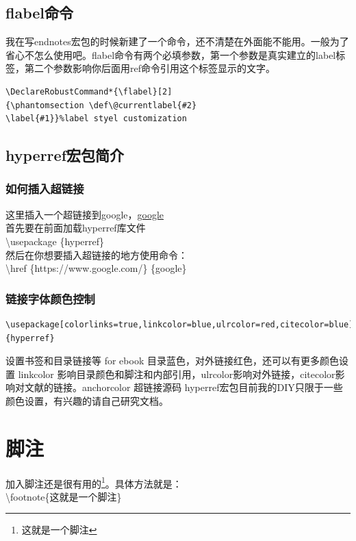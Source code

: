 \documentclass[11pt,oneside]{book}
\begin{document}
\begin{common-format}
\subsection{flabel命令}
我在写endnotes宏包的时候新建了一个命令，还不清楚在外面能不能用。一般为了省心不怎么使用吧。flabel命令有两个必填参数，第一个参数是真实建立的label标签，第二个参数影响你后面用ref命令引用这个标签显示的文字。
\begin{Verbatim}
\DeclareRobustCommand*{\flabel}[2]
{\phantomsection \def\@currentlabel{#2}
\label{#1}}%label styel customization
\end{Verbatim}


\subsection{hyperref宏包简介}
\subsubsection{如何插入超链接}
这里插入一个超链接到google，\href{https://www.google.com/}{google}\\
首先要在前面加载hyperref库文件\\
\textbackslash usepackage \{hyperref\}\\
然后在你想要插入超链接的地方使用命令：\\
\textbackslash href \{https://www.google.com/\} \{google\}

\subsubsection{链接字体颜色控制}
\begin{Verbatim}
\usepackage[colorlinks=true,linkcolor=blue,ulrcolor=red,citecolor=blue]{hyperref} 
\end{Verbatim}
设置书签和目录链接等
for ebook 目录蓝色，对外链接红色，还可以有更多颜色设置    linkcolor 影响目录颜色和脚注和内部引用，ulrcolor影响对外链接，citecolor影响对文献的链接。anchorcolor 超链接源码
hyperref宏包目前我的DIY只限于一些颜色设置，有兴趣的请自己研究文档。



\section{脚注}
加入脚注还是很有用的\footnote{这就是一个脚注}。具体方法就是：\\
\textbackslash footnote\{这就是一个脚注\} 



\end{common-format}
\end{document}
